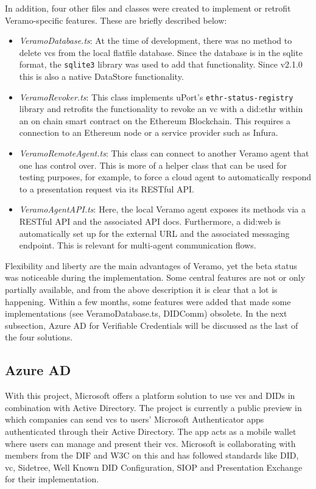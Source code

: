     In addition, four other files and classes were created to implement or retrofit Veramo-specific features. These are briefly described below:
    
    \begin{itemize}
        \item \textit{VeramoDatabase.ts}: At the time of development, there was no method to delete \acp{vc} from the local flatfile database. Since the database is in the sqlite format, the \texttt{sqlite3} library was used to add that functionality. Since v2.1.0 this is also a native DataStore functionality.
        \item \textit{VeramoRevoker.ts}: This class implements uPort's \texttt{ethr-status-registry} library and retrofits the functionality to revoke an \ac{vc} with a did:ethr within an on chain smart contract on the Ethereum Blockchain. This requires a connection to an Ethereum node or a service provider such as Infura.
        \item \textit{VeramoRemoteAgent.ts}: This class can connect to another Veramo agent that one has control over. This is more of a helper class that can be used for testing purposes, for example, to force a cloud agent to automatically respond to a presentation request via its RESTful API.
        \item \textit{VeramoAgentAPI.ts}: Here, the local Veramo agent exposes its methods via a RESTful API and the associated API docs. Furthermore, a did:web is automatically set up for the external URL and the associated messaging endpoint. This is relevant for multi-agent communication flows.
    \end{itemize}
    
    Flexibility and liberty are the main advantages of Veramo, yet the beta status was noticeable during the implementation. Some central features are not or only partially available, and from the above description it is clear that a lot is happening. Within a few months, some features were added that made some implementations (see VeramoDatabase.ts, DIDComm) obsolete. In the next subsection, Azure AD for Verifiable Credentials will be discussed as the last of the four solutions. 
    
    
    \subsection{Azure AD}\label{subsection: azure}
    
    With this project, Microsoft offers a platform solution to use \acp{vc} and \acp{DID} in combination with Active Directory. The project is currently a public preview in which companies can send \acp{vc} to users' Microsoft Authenticator apps authenticated through their Active Directory. The app acts as a mobile wallet where users can manage and present their \acp{vc}. Microsoft is collaborating with members from the DIF and W3C on this and has followed standards like \ac{DID}, \ac{vc}, Sidetree, Well Known DID Configuration, SIOP and Presentation Exchange for their implementation. \cite{neira_introduction_2021, simons_announcing_2021, microsoft_identitatsnachweis-losungen_2021}
    
